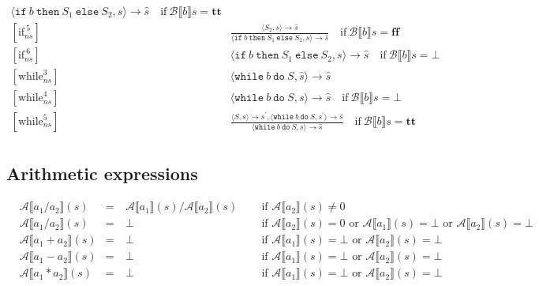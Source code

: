 \documentclass[11pt,oneside,a4paper]{article}
\newcommand{\SExp}[2]{\mathcal{#1}\llbracket #2 \rrbracket}
\newcommand{\AExp}[2]{\SExp{A}{#1}(#2)}
\begin{document}
\begin{align*}
{ \langle \texttt{if}\:b\: \texttt{then}\:  S_1 \: \texttt{else} \: S_2, s\rangle  
\rightarrow \hat{s}} \quad \text{if} \: \mathcal{B} \llbracket b \rrbracket s
= \textbf{tt}\\
[\text{if}_{ns}^{\:5}] \quad \quad & \frac{\langle S_2, s\rangle  \rightarrow \hat{s}}
{ \langle \texttt{if}\:b\: \texttt{then}\:  S_1 \: \texttt{else} \: S_2, s\rangle  
\rightarrow \hat{s}} \quad \text{if} \: \mathcal{B} \llbracket b \rrbracket s
= \textbf{ff}\\
[\text{if}_{ns}^{\:6}] \quad \quad & \langle \texttt{if}\:b\: \texttt{then}\:  S_1 \: 
\texttt{else} \: S_2, s\rangle  \rightarrow \hat{s} \quad 
\text{if} \: \mathcal{B} \llbracket b \rrbracket s
= \bot \\
[\text{while}_{ns}^3] \quad \quad & \langle \texttt{while}\: b \:\texttt{do}\: S, 
\hat{s}\rangle  \rightarrow \hat{s} \\
[\text{while}_{ns}^4] \quad \quad & 
\langle \texttt{while}\: b \:\texttt{do}\: S, s\rangle  \rightarrow \hat{s} 
\quad \text{if} \: \mathcal{B} \llbracket b \rrbracket s = \bot \\
[\text{while}_{ns}^5] \quad \quad & 
\frac{\langle S,s\rangle  \rightarrow s^{'}, \langle \texttt{while}\: b \: \texttt{do} \: S, s^{'}\rangle 
\rightarrow \hat{s}}
{\langle \texttt{while}\: b \: \texttt{do}\: S, s\rangle  \rightarrow \hat{s}} 
\quad \text{if} \: \mathcal{B} \llbracket b \rrbracket s = \textbf{tt} \\
\end{align*}
\endgroup

\subsection*{Arithmetic expressions}
\begin{align*}
&\mathcal{A}\llbracket a_1 / a_2 \rrbracket(s) &=&\: \mathcal{A}\llbracket a_1
\rrbracket(s) / \mathcal{A}\llbracket a_2 \rrbracket(s)& &\text{ if }
\mathcal{A}\llbracket a_2 \rrbracket(s) \neq 0 \\
&\AExp{a_1 / a_2}{s} &=&\: \bot& &\text{ if } 
\AExp{a_2}{s} = 0 \text{ or } \AExp{a_1}{s} = \bot 
\text{ or } \AExp{a_2}{s} = \bot \\
&\AExp{a_1 + a_2}{s} &=&\: \bot &\: &\text{ if } \AExp{a_1}{s} = \bot 
\text{ or } \AExp{a_2}{s} = \bot \\
&\AExp{a_1 - a_2}{s} &=&\: \bot &\: &\text{ if } \AExp{a_1}{s} = \bot 
\text{ or } \AExp{a_2}{s} = \bot \\
&\AExp{a_1 * a_2}{s} &=&\: \bot &\: &\text{ if } \AExp{a_1}{s} = \bot 
\text{ or } \AExp{a_2}{s} = \bot \\
\end{align*}
\end{document}
